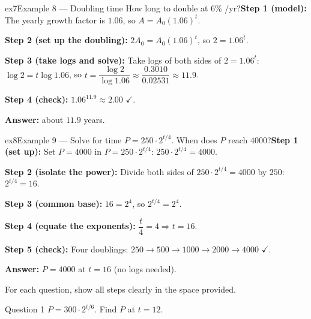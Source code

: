 \documentclass[11pt]{article}
\begin{document}
\begin{example}{ex7}{Example 8 --- Doubling time}
How long to double at 6\% /yr?\soln \textbf{Step 1 (model):} The yearly growth factor is $1.06$, so $A=A_0(1.06)^t$.

\textbf{Step 2 (set up the doubling):} $2A_0=A_0(1.06)^t$, so $2=1.06^t$.

\textbf{Step 3 (take logs and solve):} Take logs of both sides of $2=1.06^t$: $\log2=t\log1.06$, so $t=\dfrac{\log2}{\log1.06}\approx\dfrac{0.3010}{0.02531}\approx11.9$.

\textbf{Step 4 (check):} $1.06^{11.9}\approx2.00$ $\checkmark$.

\textbf{Answer:} about $11.9$ years.

\end{example}

\begin{example}{ex8}{Example 9 --- Solve for time}
$P=250\cdot2^{t/4}$. When does $P$ reach $4000$?\soln \textbf{Step 1 (set up):} Set $P=4000$ in $P=250\cdot2^{t/4}$: $250\cdot2^{t/4}=4000$.

\textbf{Step 2 (isolate the power):} Divide both sides of $250\cdot2^{t/4}=4000$ by $250$: $2^{t/4}=16$.

\textbf{Step 3 (common base):} $16=2^4$, so $2^{t/4}=2^4$.

\textbf{Step 4 (equate the exponents):} $\dfrac t4=4\Rightarrow t=16$.

\textbf{Step 5 (check):} Four doublings: $250\to500\to1000\to2000\to4000$ $\checkmark$.

\textbf{Answer:} $P=4000$ at $t=16$ (no logs needed).

\end{example}

\clearpage
{}
For each question, show all steps clearly in the space provided.

\begin{qbox}{Question 1}
$P=300\cdot2^{t/6}$. Find $P$ at $t=12$.\workspace{2.4cm}
\end{qbox}
\end{document}
